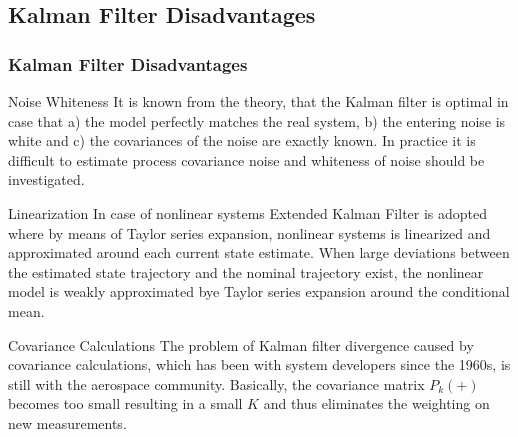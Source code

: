 \documentclass[compress]{beamer}    %
\begin{document}
\subsection{Kalman Filter Disadvantages} 
\begin{frame}\frametitle{Kalman Filter Disadvantages} 
\tiny
\begin{block}{Noise Whiteness}
It is known from the theory, that the Kalman filter is optimal in case that a) the model 
perfectly matches the real system, b) the entering noise is white and c) the covariances of 
the noise are exactly known. In practice it is difficult to estimate process covariance noise
and whiteness of noise should be investigated.
\end{block}
\begin{block}{Linearization}
In case of nonlinear systems Extended Kalman Filter is adopted where
by means of Taylor series expansion, nonlinear systems is linearized and
approximated around each current state estimate. When large deviations between
the estimated state trajectory and the nominal trajectory exist, the nonlinear model
is weakly approximated bye Taylor series expansion around the conditional mean.
\end{block}
\begin{exampleblock}{Covariance Calculations }
The problem of Kalman filter divergence caused by covariance calculations,
which has been with system developers since the 1960s, is still with the aerospace
community. Basically, the covariance matrix $P_k(+)$ becomes too small resulting
in a small $K$ and thus eliminates the weighting on new measurements.


\end{exampleblock}




\end{frame}
\end{document}
